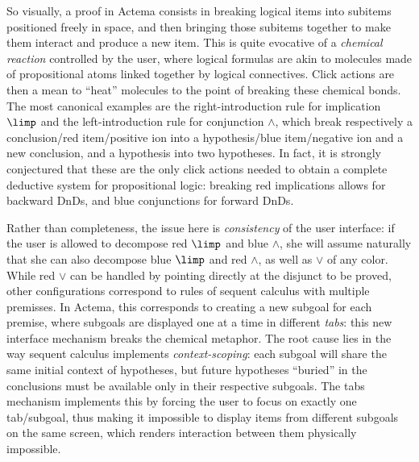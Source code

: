 So visually, a proof in Actema consists in breaking logical items into subitems
positioned freely in space, and then bringing those subitems together to make
them interact and produce a new item. This is quite evocative of a
\emph{chemical reaction} controlled by the user, where logical formulas are akin
to molecules made of propositional atoms linked together by logical
connectives. Click actions are then a mean to
``heat'' molecules to the point of breaking these chemical bonds. The most
canonical examples are the right-introduction rule for implication $\limp$ and
the left-introduction rule for conjunction $\land$, which break respectively a
conclusion/red item/positive ion into a hypothesis/blue item/negative ion and a
new conclusion, and a hypothesis into two hypotheses. In fact, it is strongly
conjectured that these are the only click actions needed to obtain a complete
deductive system for propositional logic: breaking red implications allows for
backward DnDs, and blue conjunctions for forward DnDs.

Rather than completeness, the issue here is \emph{consistency} of the user
interface: if the user is allowed to decompose red $\limp$ and blue $\land$, she
will assume naturally that she can also decompose blue $\limp$ and red $\land$,
as well as $\lor$ of any color. While red $\lor$ can be handled by pointing
directly at the disjunct to be proved, other configurations correspond to rules
of sequent calculus with multiple premisses. In Actema, this corresponds to
creating a new subgoal for each premise, where subgoals are displayed one at a
time in different \emph{tabs}: this new interface mechanism breaks the chemical
metaphor. The root cause lies in the way sequent calculus implements
\emph{context-scoping}: each subgoal will share the same initial context of
hypotheses, but future hypotheses ``buried'' in the conclusions must be
available only in their respective subgoals. The tabs mechanism implements this
by forcing the user to focus on exactly one tab/subgoal, thus making it
impossible to display items from different subgoals on the same screen, which
renders interaction between them physically impossible.



